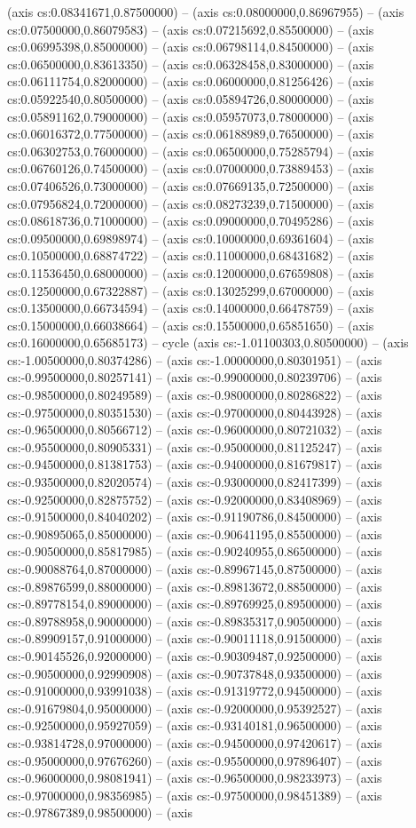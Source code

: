 (axis cs:0.08341671,0.87500000) -- (axis cs:0.08000000,0.86967955) -- (axis cs:0.07500000,0.86079583) -- (axis cs:0.07215692,0.85500000) -- (axis cs:0.06995398,0.85000000) -- (axis cs:0.06798114,0.84500000) -- (axis cs:0.06500000,0.83613350) -- (axis cs:0.06328458,0.83000000) -- (axis cs:0.06111754,0.82000000) -- (axis cs:0.06000000,0.81256426) -- (axis cs:0.05922540,0.80500000) -- (axis cs:0.05894726,0.80000000) -- (axis cs:0.05891162,0.79000000) -- (axis cs:0.05957073,0.78000000) -- (axis cs:0.06016372,0.77500000) -- (axis cs:0.06188989,0.76500000) -- (axis cs:0.06302753,0.76000000) -- (axis cs:0.06500000,0.75285794) -- (axis cs:0.06760126,0.74500000) -- (axis cs:0.07000000,0.73889453) -- (axis cs:0.07406526,0.73000000) -- (axis cs:0.07669135,0.72500000) -- (axis cs:0.07956824,0.72000000) -- (axis cs:0.08273239,0.71500000) -- (axis cs:0.08618736,0.71000000) -- (axis cs:0.09000000,0.70495286) -- (axis cs:0.09500000,0.69898974) -- (axis cs:0.10000000,0.69361604) -- (axis cs:0.10500000,0.68874722) -- (axis cs:0.11000000,0.68431682) -- (axis cs:0.11536450,0.68000000) -- (axis cs:0.12000000,0.67659808) -- (axis cs:0.12500000,0.67322887) -- (axis cs:0.13025299,0.67000000) -- (axis cs:0.13500000,0.66734594) -- (axis cs:0.14000000,0.66478759) -- (axis cs:0.15000000,0.66038664) -- (axis cs:0.15500000,0.65851650) -- (axis cs:0.16000000,0.65685173) -- cycle (axis cs:-1.01100303,0.80500000) -- (axis cs:-1.00500000,0.80374286) -- (axis cs:-1.00000000,0.80301951) -- (axis cs:-0.99500000,0.80257141) -- (axis cs:-0.99000000,0.80239706) -- (axis cs:-0.98500000,0.80249589) -- (axis cs:-0.98000000,0.80286822) -- (axis cs:-0.97500000,0.80351530) -- (axis cs:-0.97000000,0.80443928) -- (axis cs:-0.96500000,0.80566712) -- (axis cs:-0.96000000,0.80721032) -- (axis cs:-0.95500000,0.80905331) -- (axis cs:-0.95000000,0.81125247) -- (axis cs:-0.94500000,0.81381753) -- (axis cs:-0.94000000,0.81679817) -- (axis cs:-0.93500000,0.82020574) -- (axis cs:-0.93000000,0.82417399) -- (axis cs:-0.92500000,0.82875752) -- (axis cs:-0.92000000,0.83408969) -- (axis cs:-0.91500000,0.84040202) -- (axis cs:-0.91190786,0.84500000) -- (axis cs:-0.90895065,0.85000000) -- (axis cs:-0.90641195,0.85500000) -- (axis cs:-0.90500000,0.85817985) -- (axis cs:-0.90240955,0.86500000) -- (axis cs:-0.90088764,0.87000000) -- (axis cs:-0.89967145,0.87500000) -- (axis cs:-0.89876599,0.88000000) -- (axis cs:-0.89813672,0.88500000) -- (axis cs:-0.89778154,0.89000000) -- (axis cs:-0.89769925,0.89500000) -- (axis cs:-0.89788958,0.90000000) -- (axis cs:-0.89835317,0.90500000) -- (axis cs:-0.89909157,0.91000000) -- (axis cs:-0.90011118,0.91500000) -- (axis cs:-0.90145526,0.92000000) -- (axis cs:-0.90309487,0.92500000) -- (axis cs:-0.90500000,0.92990908) -- (axis cs:-0.90737848,0.93500000) -- (axis cs:-0.91000000,0.93991038) -- (axis cs:-0.91319772,0.94500000) -- (axis cs:-0.91679804,0.95000000) -- (axis cs:-0.92000000,0.95392527) -- (axis cs:-0.92500000,0.95927059) -- (axis cs:-0.93140181,0.96500000) -- (axis cs:-0.93814728,0.97000000) -- (axis cs:-0.94500000,0.97420617) -- (axis cs:-0.95000000,0.97676260) -- (axis cs:-0.95500000,0.97896407) -- (axis cs:-0.96000000,0.98081941) -- (axis cs:-0.96500000,0.98233973) -- (axis cs:-0.97000000,0.98356985) -- (axis cs:-0.97500000,0.98451389) -- (axis cs:-0.97867389,0.98500000) -- (axis 